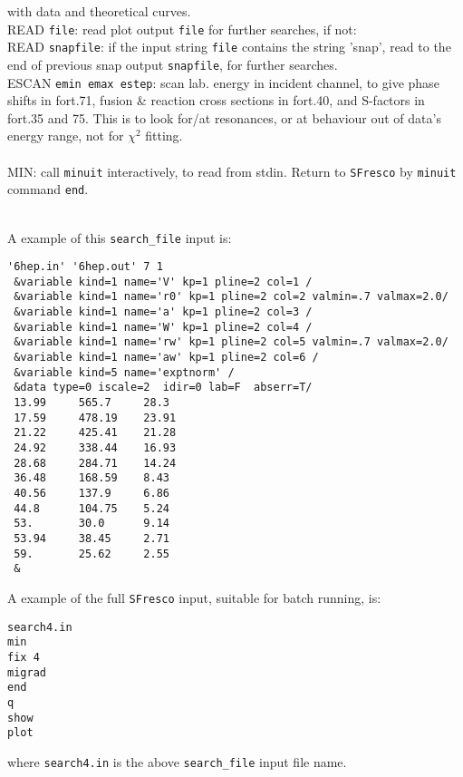 \documentclass[11pt]{article}
\begin{document}
 with data and theoretical curves.
\\ READ {\tt file}: read plot output {\tt file} for further searches, if not:
\\ READ {\tt snapfile}: if the input string {\tt file} contains the string 'snap',
read to the end of previous snap output {\tt snapfile}, for further searches.
\\ ESCAN {\tt emin emax estep}: scan lab. energy in incident channel, to give
phase shifts in fort.71, fusion \& reaction cross sections in fort.40,
 and S-factors in fort.35 and 75.
This is to look for/at resonances, or at behaviour out of data's energy range,
not for $\chi^2$ fitting.\\
\\ MIN: call {\tt minuit} interactively, to read from stdin.
Return to {\tt SFresco} by {\tt minuit} command {\tt end}.


~\\
A example of this {\tt search\_file} input is:
\begin{verbatim}
'6hep.in' '6hep.out' 7 1
 &variable kind=1 name='V' kp=1 pline=2 col=1 /
 &variable kind=1 name='r0' kp=1 pline=2 col=2 valmin=.7 valmax=2.0/
 &variable kind=1 name='a' kp=1 pline=2 col=3 /
 &variable kind=1 name='W' kp=1 pline=2 col=4 /
 &variable kind=1 name='rw' kp=1 pline=2 col=5 valmin=.7 valmax=2.0/
 &variable kind=1 name='aw' kp=1 pline=2 col=6 /
 &variable kind=5 name='exptnorm' /
 &data type=0 iscale=2  idir=0 lab=F  abserr=T/
 13.99     565.7     28.3
 17.59     478.19    23.91
 21.22     425.41    21.28
 24.92     338.44    16.93
 28.68     284.71    14.24
 36.48     168.59    8.43
 40.56     137.9     6.86
 44.8      104.75    5.24
 53.       30.0      9.14
 53.94     38.45     2.71
 59.       25.62     2.55
 &
\end{verbatim}
\normalsize
A example of the full {\tt SFresco} input, suitable for batch running, is:
\begin{verbatim}
search4.in
min
fix 4
migrad
end
q
show
plot
\end{verbatim}
\normalsize
where {\tt search4.in} is the above {\tt search\_file} input file name.
\end{document}
